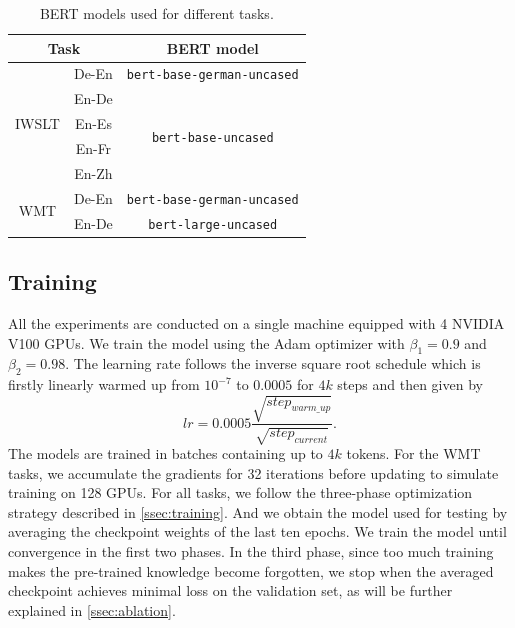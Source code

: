 \documentclass[review]{elsarticle}
\begin{document}
\begin{table}[ht]
    \caption{BERT models used for different tasks.}
    \label{tab:bert_model}
    \centering
    \begin{tabular}{c|c|c}
        \toprule
        \multicolumn{2}{c|}{\textbf{Task}} & \textbf{BERT model} \\
        \midrule
        \multirow{5}{*}{IWSLT} & De-En & \texttt{bert-base-german-uncased} \\
        \cline{2-3}
        & En-De & \multirow{4}{*}{\texttt{bert-base-uncased}} \\
        & En-Es \\
        & En-Fr \\
        & En-Zh \\
        \hline
        \multirow{2}{*}{WMT} & De-En & \texttt{bert-base-german-uncased} \\
        \cline{2-3}
        &  En-De & \texttt{bert-large-uncased}\\
        \bottomrule
    \end{tabular}
\end{table}



\subsection{Training}
All the experiments are conducted on a single machine equipped with 4 NVIDIA V100 GPUs. We train the model using the Adam optimizer \cite{Kingma15} with $\beta_1=0.9$ and $\beta_2=0.98$. The learning rate follows the inverse square root schedule which is firstly linearly warmed up from $10^{-7}$ to $0.0005$ for $4k$ steps and then given by
\begin{equation}
    lr=0.0005\frac{\sqrt{step_{warm\_up}}}{\sqrt{step_{current}}}.
\end{equation}
The models are trained in batches containing up to $4k$ tokens. For the WMT tasks, we accumulate the gradients for 32 iterations before updating to simulate training on 128 GPUs.
For all tasks, we follow the three-phase optimization strategy described in \cref{ssec:training}. And we obtain the model used for testing by averaging the checkpoint weights of the last ten epochs. We train the model until convergence in the first two phases. In the third phase, since too much training makes the pre-trained knowledge become forgotten, we stop when the averaged checkpoint achieves minimal loss on the validation set, as will be further explained in \cref{ssec:ablation}.
\end{document}
